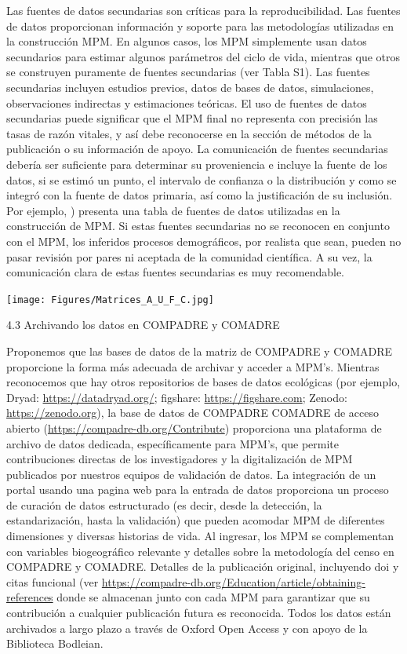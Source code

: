 \documentclass[
]{book}
\theoremstyle{definition}
\theoremstyle{definition}
\theoremstyle{definition}
\theoremstyle{definition}
\theoremstyle{remark}
\begin{document}
Las fuentes de datos secundarias son críticas para la reproducibilidad. Las fuentes de datos proporcionan información y soporte para las metodologías utilizadas en la construcción MPM. En algunos casos, los MPM simplemente usan datos secundarios para estimar algunos parámetros del ciclo de vida, mientras que otros se construyen puramente de fuentes secundarias (ver Tabla S1). Las fuentes secundarias incluyen estudios previos, datos de bases de datos, simulaciones, observaciones indirectas y estimaciones teóricas. El uso de fuentes de datos secundarias puede significar que el MPM final no representa con precisión las tasas de razón vitales, y así debe reconocerse en la sección de métodos de la publicación o su información de apoyo. La comunicación de fuentes secundarias debería ser suficiente para determinar su proveniencia e incluye la fuente de los datos, si se estimó un punto, el intervalo de confianza o la distribución y como se integró con la fuente de datos primaria, así como la justificación de su inclusión. Por ejemplo, \citet{omeyer2021investigating}) presenta una tabla de fuentes de datos utilizadas en la construcción de MPM. Si estas fuentes secundarias no se reconocen en conjunto con el MPM, los inferidos procesos demográficos, por realista que sean, pueden no pasar revisión por pares ni aceptada de la comunidad científica. A su vez, la comunicación clara de estas fuentes secundarias es muy recomendable.

\texttt{[image: Figures/Matrices\_A\_U\_F\_C.jpg]}

4.3 \textbar{} Archivando los datos en COMPADRE y COMADRE

Proponemos que las bases de datos de la matriz de COMPADRE y COMADRE proporcione la forma más adecuada de archivar y acceder a MPM's. Mientras reconocemos que hay otros repositorios de bases de datos ecológicas (por ejemplo, Dryad: \url{https://datadryad.org/}; figshare: \url{https://figshare.com}; Zenodo: \url{https://zenodo.org}), la base de datos de COMPADRE COMADRE de acceso abierto (\url{https://compadre-db.org/Contribute}) proporciona una plataforma de archivo de datos dedicada, específicamente para MPM's, que permite contribuciones directas de los investigadores y la digitalización de MPM publicados por nuestros equipos de validación de datos. La integración de un portal usando una pagina web para la entrada de datos proporciona un proceso de curación de datos estructurado (es decir, desde la detección, la estandarización, hasta la validación) que pueden acomodar MPM de diferentes dimensiones y diversas historias de vida. Al ingresar, los MPM se complementan con variables biogeográfico relevante y detalles sobre la metodología del censo en COMPADRE y COMADRE. Detalles de la publicación original, incluyendo doi y citas funcional (ver \url{https://compadre-db.org/Education/article/obtaining-references} donde se almacenan junto con cada MPM para garantizar que su contribución a cualquier publicación futura es reconocida. Todos los datos están archivados a largo plazo a través de Oxford Open Access y con apoyo de la Biblioteca Bodleian.
\end{document}
